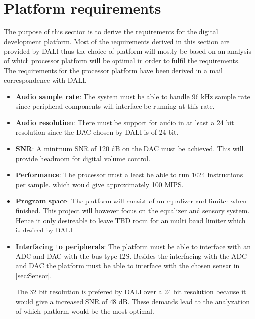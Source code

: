 \section{Platform requirements}
The purpose of this section is to derive the requirements for the digital development platform. Most of the requirements derived in this section are provided by DALI thus the choice of platform will mostly be based on an analysis of which processor platform will be optimal in order to fulfil the requirements. The requirements for the processor platform have been derived in a mail correspondence with DALI.
\begin{itemize}
\item \textbf{Audio sample rate}: The system must be able to handle 96 kHz sample rate since peripheral components will interface be running at this rate.
\item \textbf{Audio resolution}: There must be support for audio in at least a 24 bit resolution since the \gls{DAC} chosen by DALI is of 24 bit.
\item \textbf{\gls{SNR}}: A minimum \gls{SNR} of 120 dB on the \gls{DAC} must be achieved. This will provide headroom for digital volume control.
\item \textbf{Performance}: The processor must a least be able to run 1024 instructions per sample. which would give approximately 100 \gls{MIPS}.
\item \textbf{Program space}: The platform will consist of an equalizer and limiter when finished. This project will however focus on the equalizer and sensory system. Hence it only desireable to leave TBD room for an multi band limiter which is desired by DALI. 
\item \textbf{Interfacing to peripherals}: The platform must be able to interface with an ADC and DAC with the bus type \gls{I2S}. Besides the interfacing with the ADC and DAC the platform must be able to interface with the chosen sensor in \autoref{sec:Sensor}.

The 32 bit resolution is prefered by DALI over a 24 bit resolution because it would give a increased \gls{SNR} of 48 dB. These demands lead to the analyzation of which platform would be the most optimal.  
\end{itemize}


